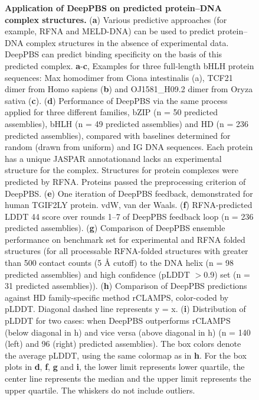 \begin{center}
\begin{figure} [t!]
  \caption[Application of DeepPBS on predicted protein–DNA complex structures.]{\textbf{Application of DeepPBS on predicted protein–DNA complex structures.} ({\bf a}) Various predictive approaches (for example, RFNA and MELD-DNA) can be used to predict protein–DNA complex structures in the absence of experimental data. DeepPBS can predict binding specificity on the basis of this predicted complex. {\bf a}-{\bf c}, Examples for three full-length bHLH protein sequences: Max homodimer from Ciona intestinalis (a), TCF21 dimer from Homo sapiens ({\bf b}) and OJ1581\_H09.2 dimer from Oryza sativa ({\bf c}). ({\bf d}) Performance of DeepPBS via the same process applied for three different families, bZIP (n = 50 predicted assemblies), bHLH (n = 49 predicted assemblies) and HD (n = 236 predicted assemblies), compared with baselines determined for random (drawn from uniform) and IG DNA sequences. Each protein has a unique JASPAR annotationand lacks an experimental structure for the complex. Structures for protein complexes were predicted by RFNA. Proteins passed the preprocessing criterion of DeepPBS. ({\bf e}) One iteration of DeepPBS feedback, demonstrated for human TGIF2LY protein. vdW, van der Waals. ({\bf f}) RFNA-predicted LDDT 44 score over rounds 1–7 of DeepPBS feedback loop (n = 236 predicted assemblies). ({\bf g}) Comparison of DeepPBS ensemble performance on benchmark set for experimental and RFNA folded structures (for all processable RFNA-folded structures with greater than 500 contact counts (5 Å cutoff) to the DNA helix (n = 98 predicted assemblies) and high confidence (pLDDT $>$0.9) set (n = 31 predicted assemblies)). ({\bf h}) Comparison of DeepPBS predictions against HD family-specific method rCLAMPS, color-coded by pLDDT. Diagonal dashed line represents y = x. ({\bf i}) Distribution of pLDDT for two cases: when DeepPBS outperforms rCLAMPS (below diagonal in h) and vice versa (above diagonal in h) (n = 140 (left) and 96 (right) predicted assemblies). The box colors denote the average pLDDT, using the same colormap as in {\bf h}. For the box plots in {\bf d}, {\bf f}, {\bf g} and {\bf i}, the lower limit represents lower quartile, the center line represents the median and the upper limit represents the upper quartile. The whiskers do not include outliers.}
\end{figure}
\end{center}

